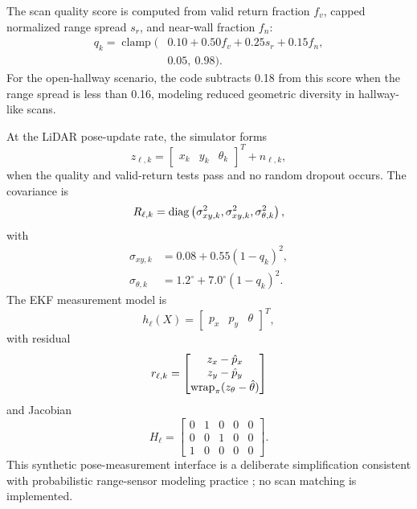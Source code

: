 The scan quality score is computed from valid return fraction \(f_v\), capped normalized range spread \(s_r\), and near-wall fraction \(f_n\):
\begin{align}
    q_k=\operatorname{clamp}\big(
    &0.10+0.50f_v+0.25s_r+0.15f_n,\nonumber\\
    &0.05,\ 0.98
    \big).
\end{align}
For the open-hallway scenario, the code subtracts 0.18 from this score when the range spread is less than 0.16, modeling reduced geometric diversity in hallway-like scans.

At the LiDAR pose-update rate, the simulator forms
\begin{equation}
    z_{\ell,k} =
    \begin{bmatrix}
    x_k & y_k & \theta_k
    \end{bmatrix}^{T}
    + n_{\ell,k},
\end{equation}
when the quality and valid-return tests pass and no random dropout occurs. The covariance is
\begin{equation}
R_{\ell,k}=\operatorname{diag}
\left(
\sigma_{xy,k}^{2},\sigma_{xy,k}^{2},\sigma_{\theta,k}^{2}
\right),
\end{equation}
with
\begin{align}
    \sigma_{xy,k} &= 0.08+0.55(1-q_k)^2,\\
    \sigma_{\theta,k} &= 1.2^\circ+7.0^\circ(1-q_k)^2.
\end{align}
The EKF measurement model is
\begin{equation}
    h_{\ell}(X)=
    \begin{bmatrix}
    p_x & p_y & \theta
    \end{bmatrix}^{T},
\end{equation}
with residual
\begin{equation}
    r_{\ell,k}=
    \begin{bmatrix}
    z_x-\hat{p}_x\\
    z_y-\hat{p}_y\\
    \operatorname{wrap}_{\pi}(z_\theta-\hat{\theta})
    \end{bmatrix}
\end{equation}
and Jacobian
\begin{equation}
H_{\ell}=
\begin{bmatrix}
0 & 1 & 0 & 0 & 0\\
0 & 0 & 1 & 0 & 0\\
1 & 0 & 0 & 0 & 0
\end{bmatrix}.
\label{eq:lidar_H}
\end{equation}
This synthetic pose-measurement interface is a deliberate simplification consistent with probabilistic range-sensor modeling practice \citep{thrun2005probabilistic,dellaertHutchinson2023robotics}; no scan matching is implemented.

